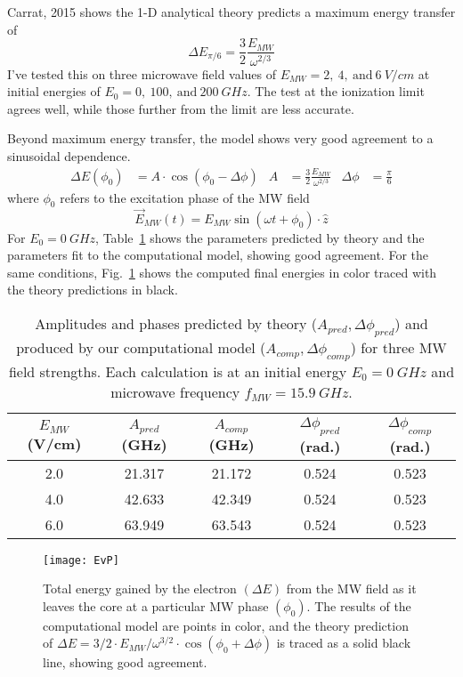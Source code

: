\documentclass[aps,pra,preprint,groupedaddress]{revtex4-1}
\begin{document}
Carrat, 2015 shows the 1-D analytical theory predicts a maximum energy transfer of
\begin{equation*}
\Delta E_{\pi/6} = \frac{3}{2} \frac{E_{MW}}{\omega^{2/3}}
\end{equation*}
I've tested this on three microwave field values of $E_{MW} = 2, ~ 4, ~ \text{and} ~ 6 ~ V/cm$ at initial energies of $E_0 = 0, ~ 100, ~ \text{and} ~ 200 ~ GHz$. The test at the ionization limit agrees well, while those further from the limit are less accurate.

Beyond maximum energy transfer, the model shows very good agreement to a sinusoidal dependence.
\begin{align*}
\Delta E(\phi_0) & = A \cdot \cos{(\phi_0 - \Delta \phi)} & A & = \frac{3}{2} \frac{E_{MW}}{\omega^{2/3}} & \Delta \phi & = \frac{\pi}{6}
\end{align*}
where $\phi_0$ refers to the excitation phase of the MW field
\begin{equation*}
\vec{E}_{MW}(t) = E_{MW} \sin{(\omega t + \phi_0)} \cdot \hat{z}
\end{equation*}
For $E_0 = 0 ~ GHz$, Table~\ref{tab:EvP} shows the parameters predicted by theory and the parameters fit to the computational model, showing good agreement. For the same conditions, Fig.~\ref{fig:EvP} shows the computed final energies in color traced with the theory predictions in black.

\begin{table}
	\caption{\label{tab:EvP} Amplitudes and phases predicted by theory ($A_{pred}, \Delta \phi_{pred}$) and produced by our computational model ($A_{comp}, \Delta\phi_{comp}$) for three MW field strengths. Each calculation is at an initial energy $E_0 = 0 ~ GHz$ and microwave frequency $f_{MW} = 15.9 ~ GHz$.}
	\begin{ruledtabular}
	\begin{tabular}{c|cc|cc}
	$E_{MW}$ (V/cm) & $A_{pred}$ (GHz) & $A_{comp}$ (GHz) & $\Delta \phi_{pred}$ (rad.) & $\Delta \phi_{comp}$ (rad.) \\ \hline
	2.0 & 21.317 & 21.172 & 0.524 & 0.523 \\
	4.0 & 42.633 & 42.349 & 0.524 & 0.523 \\
	6.0 & 63.949 & 63.543 & 0.524 & 0.523
	\end{tabular}
	\end{ruledtabular}
\end{table}

\begin{figure}
	\texttt{[image: EvP]}
	\caption{\label{fig:EvP} Total energy gained by the electron $(\Delta E)$ from the MW field as it leaves the core at a particular MW phase $(\phi_0)$. The results of the computational model are points in color, and the theory prediction of $\Delta E = 3/2 \cdot E_{MW}/\omega^{3/2} \cdot \cos{(\phi_0 + \Delta\phi)}$ is traced as a solid black line, showing good agreement.}
\end{figure}
\end{document}
